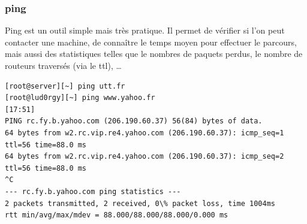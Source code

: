 \documentclass[a4paper,12pt]{article}
\begin{document}
\subsubsection{ping}
Ping est un outil simple mais très pratique. Il permet de vérifier si l'on peut contacter une machine, de connaître le temps moyen pour effectuer le parcours, mais aussi des statistiques telles que le nombres de paquets perdus, le nombre de routeurs traversés (via le ttl), \ldots

{\footnotesize \begin{verbatim}
[root@server][~] ping utt.fr
[root@lud0rgy][~] ping www.yahoo.fr                                                                                                                               [17:51]
PING rc.fy.b.yahoo.com (206.190.60.37) 56(84) bytes of data.
64 bytes from w2.rc.vip.re4.yahoo.com (206.190.60.37): icmp_seq=1 ttl=56 time=88.0 ms
64 bytes from w2.rc.vip.re4.yahoo.com (206.190.60.37): icmp_seq=2 ttl=56 time=88.0 ms
^C
--- rc.fy.b.yahoo.com ping statistics ---
2 packets transmitted, 2 received, 0\% packet loss, time 1004ms
rtt min/avg/max/mdev = 88.000/88.000/88.000/0.000 ms       
\end{verbatim}}
\end{document}
